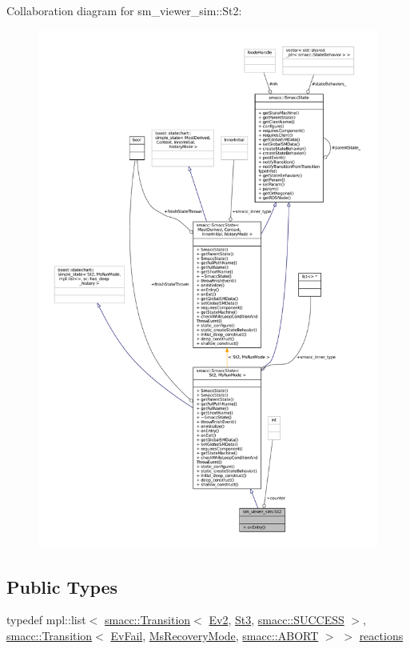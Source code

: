 Collaboration diagram for sm\+\_\+viewer\+\_\+sim\+:\+:St2\+:
\nopagebreak
\begin{figure}[H]
\begin{center}
\leavevmode
\includegraphics[width=350pt]{structsm__viewer__sim_1_1St2__coll__graph}
\end{center}
\end{figure}
\subsection*{Public Types}
\begin{DoxyCompactItemize}
\item 
typedef mpl\+::list$<$ \hyperlink{classsmacc_1_1Transition}{smacc\+::\+Transition}$<$ \hyperlink{structsm__viewer__sim_1_1Ev2}{Ev2}, \hyperlink{structsm__viewer__sim_1_1St3}{St3}, \hyperlink{structsmacc_1_1default__transition__tags_1_1SUCCESS}{smacc\+::\+S\+U\+C\+C\+E\+SS} $>$, \hyperlink{classsmacc_1_1Transition}{smacc\+::\+Transition}$<$ \hyperlink{structsm__viewer__sim_1_1EvFail}{Ev\+Fail}, \hyperlink{structsm__viewer__sim_1_1MsRecoveryMode}{Ms\+Recovery\+Mode}, \hyperlink{structsmacc_1_1default__transition__tags_1_1ABORT}{smacc\+::\+A\+B\+O\+RT} $>$ $>$ \hyperlink{structsm__viewer__sim_1_1St2_a37c15b5bdaf67bc96605679263915de8}{reactions}
\end{DoxyCompactItemize}
